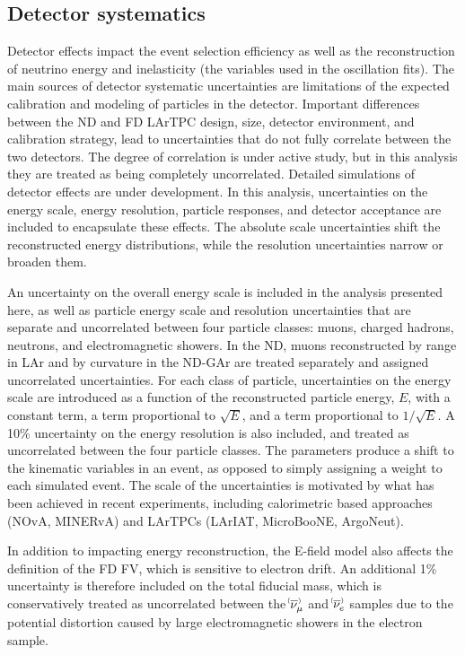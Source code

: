 \subsection{Detector systematics}
Detector effects impact the event selection efficiency as well as the reconstruction of neutrino energy and inelasticity (the variables used in the oscillation fits). The main sources of detector systematic uncertainties are limitations of the expected calibration and modeling of particles in the detector. Important differences between the ND and FD LArTPC design, size, detector environment, and calibration strategy, lead to uncertainties that do not fully correlate between the two detectors. The degree of correlation is under active study, but in this analysis they are treated as being completely uncorrelated. Detailed simulations of detector effects are under development. In this analysis, uncertainties on the energy scale, energy resolution, particle responses, and detector acceptance are included to encapsulate these effects. The absolute scale uncertainties shift the reconstructed energy distributions, while the resolution uncertainties narrow or broaden them.

An uncertainty on the overall energy scale is included in the analysis presented here, as well as particle energy scale and resolution uncertainties that are separate and uncorrelated between four particle classes: muons, charged hadrons, neutrons, and electromagnetic showers. In the ND, muons reconstructed by range in LAr and by curvature in the ND-GAr are treated separately and assigned uncorrelated uncertainties. For each class of particle, uncertainties on the energy scale are introduced as a function of the reconstructed particle energy, $E$, with a constant term, a term proportional to $\sqrt{E}$, and a term proportional to $1/\sqrt{E}$. A 10\% uncertainty on the energy resolution is also included, and treated as uncorrelated between the four particle classes. The parameters produce a shift to the kinematic variables in an event, as opposed to simply assigning a weight to each simulated event. The scale of the uncertainties is motivated by what has been achieved in recent experiments, including calorimetric based approaches (NOvA, MINERvA) and LArTPCs (LArIAT, MicroBooNE, ArgoNeut).

In addition to impacting energy reconstruction, the E-field model also affects the definition of the FD FV, which is sensitive to electron drift. An additional 1\% uncertainty is therefore included on the total fiducial mass, which is conservatively treated as uncorrelated between the $\nu^{\bracketbar}_{\mu}$ and $\nu^{\bracketbar}_{e}$ samples due to the potential distortion caused by large electromagnetic showers in the electron sample.

